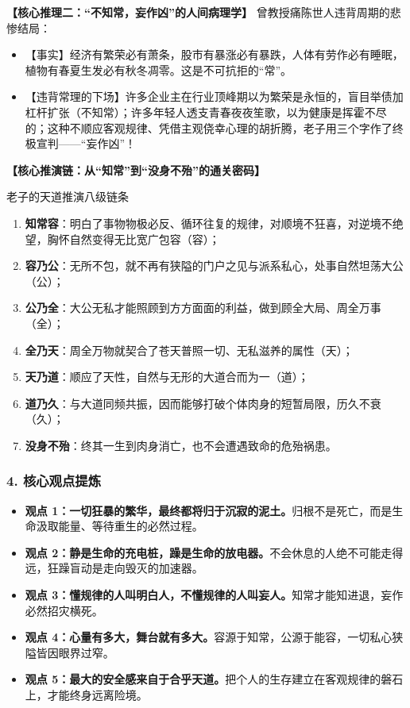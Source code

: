 \noindent\textbf{【核心推理二：“不知常，妄作凶”的人间病理学】}
曾教授痛陈世人违背周期的悲惨结局：
\begin{itemize}
    \item 【事实】经济有繁荣必有萧条，股市有暴涨必有暴跌，人体有劳作必有睡眠，植物有春夏生发必有秋冬凋零。这是不可抗拒的“常”。
    \item 【违背常理的下场】许多企业主在行业顶峰期以为繁荣是永恒的，盲目举债加杠杆扩张（不知常）；许多年轻人透支青春夜夜笙歌，以为健康是挥霍不尽的；这种不顺应客观规律、凭借主观侥幸心理的胡折腾，老子用三个字作了终极宣判——“妄作凶”！
\end{itemize}

\noindent\textbf{【核心推演链：从“知常”到“没身不殆”的通关密码】}
\begin{DeductionBox}{老子的天道推演八级链条}
\begin{enumerate}
    \item \textbf{知常容}：明白了事物物极必反、循环往复的规律，对顺境不狂喜，对逆境不绝望，胸怀自然变得无比宽广包容（容）；
    \item \textbf{容乃公}：无所不包，就不再有狭隘的门户之见与派系私心，处事自然坦荡大公（公）；
    \item \textbf{公乃全}：大公无私才能照顾到方方面面的利益，做到顾全大局、周全万事（全）；
    \item \textbf{全乃天}：周全万物就契合了苍天普照一切、无私滋养的属性（天）；
    \item \textbf{天乃道}：顺应了天性，自然与无形的大道合而为一（道）；
    \item \textbf{道乃久}：与大道同频共振，因而能够打破个体肉身的短暂局限，历久不衰（久）；
    \item \textbf{没身不殆}：终其一生到肉身消亡，也不会遭遇致命的危殆祸患。
\end{enumerate}
\end{DeductionBox}

\subsubsection{4. 核心观点提炼}
\begin{itemize}
    \item \textbf{观点 1：一切狂暴的繁华，最终都将归于沉寂的泥土。}归根不是死亡，而是生命汲取能量、等待重生的必然过程。
    \item \textbf{观点 2：静是生命的充电桩，躁是生命的放电器。}不会休息的人绝不可能走得远，狂躁盲动是走向毁灭的加速器。
    \item \textbf{观点 3：懂规律的人叫明白人，不懂规律的人叫妄人。}知常才能知进退，妄作必然招灾横死。
    \item \textbf{观点 4：心量有多大，舞台就有多大。}容源于知常，公源于能容，一切私心狭隘皆因眼界过窄。
    \item \textbf{观点 5：最大的安全感来自于合乎天道。}把个人的生存建立在客观规律的磐石上，才能终身远离险境。
\end{itemize}

